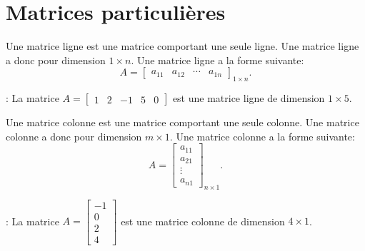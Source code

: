 \documentclass[12pt,a4paper]{book}
\numberwithin{definition}{chapter}
\theoremstyle{plain}
\begin{document}
	\section{Matrices particulières}
	\begin{definition}
		Une matrice ligne est une matrice comportant une seule ligne. Une matrice ligne a donc
		pour dimension $1\times n$. Une matrice ligne a la forme suivante:
		\begin{equation*}
			A=
			\begin{bmatrix}
				a_{11} & a_{12} & \cdots & a_{1n}
			\end{bmatrix}_{1\times n}.
		\end{equation*}
	\end{definition}
	\begin{example}: La matrice
		$
		A=
		\begin{bmatrix}
			1 & 2 & -1 & 5 & 0
		\end{bmatrix}
		$ est une matrice ligne de dimension $1\times 5$.
	\end{example}
	\begin{definition}
		Une matrice colonne est une matrice comportant une seule colonne.  Une matrice colonne a donc
		pour dimension $m\times 1$. Une matrice colonne a la forme suivante:
		\begin{equation*}
			A=\begin{bmatrix}
				a_{11}  \\
				a_{21}  \\
				\vdots  \\
				a_{n1}
			\end{bmatrix}_{n\times 1}.
		\end{equation*}
	\end{definition}
	\begin{example}: La matrice
		$
		A=
		\begin{bmatrix}
			-1 \\
			0 \\
			2 \\
			4
		\end{bmatrix}$ est une matrice colonne de dimension $4\times 1$.
	\end{example}
\end{document}
